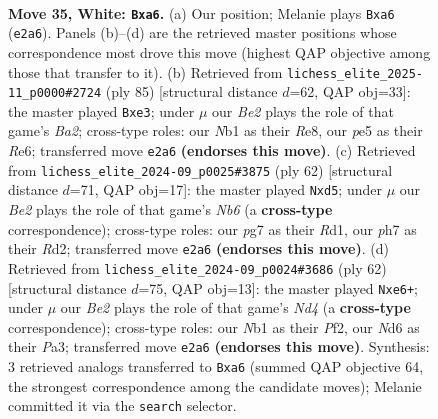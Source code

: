 \documentclass[11pt]{article}
\begin{document}
\clearpage

\begin{figure}[p]\centering
\begin{subfigure}{0.46\textwidth}\centering
\resizebox{\linewidth}{!}{%
\newchessgame
\chessboard[
  setfen={r4k2/2r2ppp/nnbN4/p3p1P1/8/1P2P1R1/P3B1PP/RN4K1 w - - 8 35},
  showmover=false,
  pgfstyle=straightmove, color=movearrow, markmove={e2-a6}
]}
\caption{}
\end{subfigure}\hfill
\begin{subfigure}{0.46\textwidth}\centering
\resizebox{\linewidth}{!}{%
\newchessgame
\chessboard[
  setfen={2k1r3/bpp3p1/4r1n1/1P2p1P1/p3P3/B1P1NN2/P1K5/5R1R b - - 0 43},
  showmover=false,
  pgfstyle=straightmove, color=movearrow, markmove={a7-e3}
]}
\caption{}
\end{subfigure}
\\[4pt]
\begin{subfigure}{0.46\textwidth}\centering
\resizebox{\linewidth}{!}{%
\newchessgame
\chessboard[
  setfen={3rr3/5kpn/1Np4p/p2b1p2/3B4/1P3PP1/P2RPK1P/3R4 w - - 10 32},
  showmover=false,
  pgfstyle=straightmove, color=movearrow, markmove={b6-d5}
]}
\caption{}
\end{subfigure}\hfill
\begin{subfigure}{0.46\textwidth}\centering
\resizebox{\linewidth}{!}{%
\newchessgame
\chessboard[
  setfen={r3rk2/p4p2/1n2b2p/N1R3p1/1P1N4/P2R2P1/5PP1/6K1 w - - 3 32},
  showmover=false,
  pgfstyle=straightmove, color=movearrow, markmove={d4-e6}
]}
\caption{}
\end{subfigure}
\caption{\textbf{Move 35, White: \texttt{Bxa6}.} (a) Our position; Melanie plays \texttt{Bxa6} (\texttt{e2a6}). Panels (b)--(d) are the retrieved master positions whose correspondence most drove this move (highest QAP objective among those that transfer to it). (b) Retrieved from \texttt{lichess\_elite\_2025-11\_p0000\#2724} (ply 85) [structural distance $d$=62, QAP obj=33]: the master played \texttt{Bxe3}; under $\mu$ our \emph{Be2} plays the role of that game's \emph{Ba2}; cross-type roles: our \emph{N}b1 as their \emph{R}e8, our \emph{p}e5 as their \emph{R}e6; transferred move \texttt{e2a6} \textbf{(endorses this move)}. (c) Retrieved from \texttt{lichess\_elite\_2024-09\_p0025\#3875} (ply 62) [structural distance $d$=71, QAP obj=17]: the master played \texttt{Nxd5}; under $\mu$ our \emph{Be2} plays the role of that game's \emph{Nb6} (a \textbf{cross-type} correspondence); cross-type roles: our \emph{p}g7 as their \emph{R}d1, our \emph{p}h7 as their \emph{R}d2; transferred move \texttt{e2a6} \textbf{(endorses this move)}. (d) Retrieved from \texttt{lichess\_elite\_2024-09\_p0024\#3686} (ply 62) [structural distance $d$=75, QAP obj=13]: the master played \texttt{Nxe6+}; under $\mu$ our \emph{Be2} plays the role of that game's \emph{Nd4} (a \textbf{cross-type} correspondence); cross-type roles: our \emph{N}b1 as their \emph{P}f2, our \emph{N}d6 as their \emph{P}a3; transferred move \texttt{e2a6} \textbf{(endorses this move)}. Synthesis: 3 retrieved analogs transferred to \texttt{Bxa6} (summed QAP objective 64, the strongest correspondence among the candidate moves); Melanie committed it via the \texttt{search} selector.}
\label{fig:thought-m68}
\end{figure}
\end{document}
